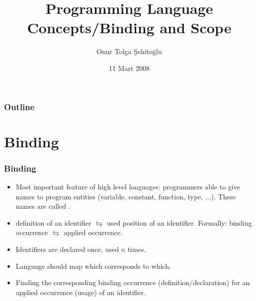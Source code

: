 \usepackage{etex}
\usepackage{pstricks,pst-node} %
\usepackage[utf8]{inputenc}
\usepackage{listings}
\usepackage{multicol}

\def\circtxt#1{$\mathalpha \bigcirc \mkern-13mu \mathtt #1$}

{
  \usepackage{fullpage}
  \usepackage{pgf}
  \usepackage{hyperref}
}

{

}


\title{Programming Language Concepts/Binding and Scope}
\author{Onur Tolga Şehitoğlu}
\subject{Binding and Scope}
\date{11 Mart 2008}


%
%
%
%

 \frame[plain]{\maketitle}
 \begin{frame}
 \frametitle{Outline}
 \begin{multicols}{2}
 \tableofcontents
 \end{multicols}
 \end{frame}
\section{Binding}
\begin{frame}
\frametitle{Binding}
\begin{itemize}[<+->]
\item Most important feature of high level languages: programmers able to
give names to program entities (variable, constant, function, type, ...).
These names are called .
\item definition of an identifier $\leftrightarrows$ used position of an
identifier. Formally:
binding occurrence $\leftrightarrows$ applied occurrence.
\item Identifiers are declared once, used $n$ times.
\item Language should map which corresponds to which.
\item {} Finding the corresponding binding occurrence
(definition/declaration) for an applied occurrence (usage) of an identifier.
\end{itemize}
\end{frame}

